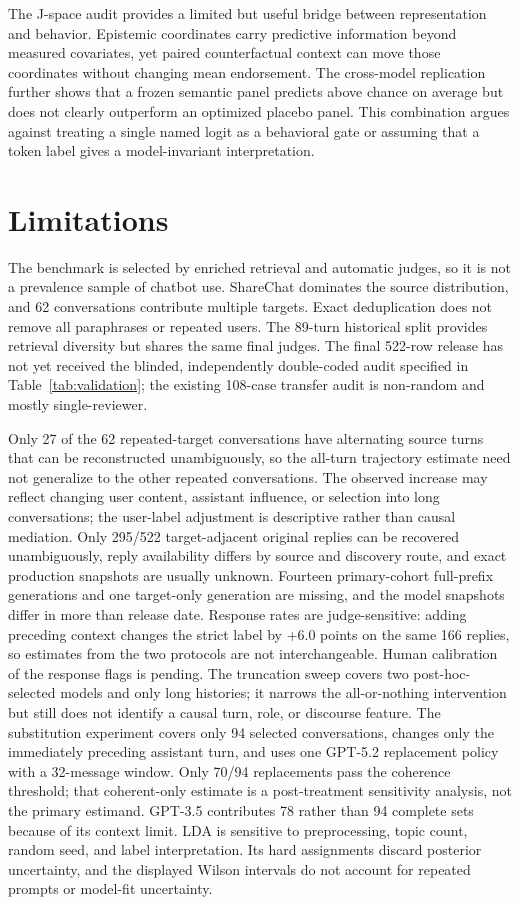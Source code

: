 \documentclass{article}
\begin{document}
The J-space audit provides a limited but useful bridge between representation and behavior. Epistemic coordinates carry predictive information beyond measured covariates, yet paired counterfactual context can move those coordinates without changing mean endorsement. The cross-model replication further shows that a frozen semantic panel predicts above chance on average but does not clearly outperform an optimized placebo panel. This combination argues against treating a single named logit as a behavioral gate or assuming that a token label gives a model-invariant interpretation.

\section{Limitations}

The benchmark is selected by enriched retrieval and automatic judges, so it is not a prevalence sample of chatbot use. ShareChat dominates the source distribution, and 62 conversations contribute multiple targets. Exact deduplication does not remove all paraphrases or repeated users. The 89-turn historical split provides retrieval diversity but shares the same final judges. The final 522-row release has not yet received the blinded, independently double-coded audit specified in Table~\ref{tab:validation}; the existing 108-case transfer audit is non-random and mostly single-reviewer.

Only 27 of the 62 repeated-target conversations have alternating source turns that can be reconstructed unambiguously, so the all-turn trajectory estimate need not generalize to the other repeated conversations. The observed increase may reflect changing user content, assistant influence, or selection into long conversations; the user-label adjustment is descriptive rather than causal mediation. Only 295/522 target-adjacent original replies can be recovered unambiguously, reply availability differs by source and discovery route, and exact production snapshots are usually unknown. Fourteen primary-cohort full-prefix generations and one target-only generation are missing, and the model snapshots differ in more than release date. Response rates are judge-sensitive: adding preceding context changes the strict label by +6.0 points on the same 166 replies, so estimates from the two protocols are not interchangeable. Human calibration of the response flags is pending. The truncation sweep covers two post-hoc-selected models and only long histories; it narrows the all-or-nothing intervention but still does not identify a causal turn, role, or discourse feature. The substitution experiment covers only 94 selected conversations, changes only the immediately preceding assistant turn, and uses one GPT-5.2 replacement policy with a 32-message window. Only 70/94 replacements pass the coherence threshold; that coherent-only estimate is a post-treatment sensitivity analysis, not the primary estimand. GPT-3.5 contributes 78 rather than 94 complete sets because of its context limit. LDA is sensitive to preprocessing, topic count, random seed, and label interpretation. Its hard assignments discard posterior uncertainty, and the displayed Wilson intervals do not account for repeated prompts or model-fit uncertainty.
\end{document}
